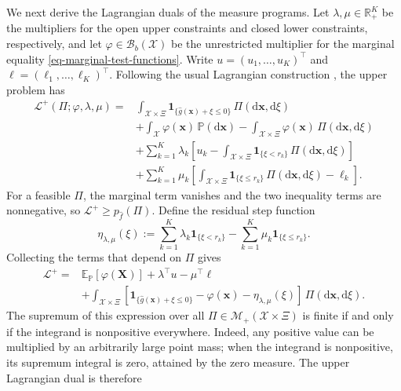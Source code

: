\documentclass[review,11pt,3p,authoryear,nopreprintline]{elsarticle}
\begin{document}
We next derive the Lagrangian duals of the measure programs. Let $\lambda,\mu\in\mathbb R_+^K$ be the multipliers for the open upper constraints and closed lower constraints, respectively, and let $\varphi\in\mathcal B_b(\mathcal X)$ be the unrestricted multiplier for the marginal equality \eqref{eq-marginal-test-functions}. Write $u=(u_1,\ldots,u_K)^\top$ and $\ell=(\ell_1,\ldots,\ell_K)^\top$. Following the usual Lagrangian construction \citep[Section~5.1]{B.V04}, the upper problem has
\begin{equation}
  \begin{aligned}
    \mathcal L^+\left(\Pi;\varphi,\lambda,\mu\right)={}&
    \int_{\mathcal X\times\Xi}\mathbf1_{\{\hat g(\bm x)+\xi\le0\}}\,\Pi\left(\mathrm d\bm x,\mathrm d\xi\right)\\
    &+\int_{\mathcal X}\varphi(\bm x)\,\mathbb P\left(\mathrm d\bm x\right)
    -\int_{\mathcal X\times\Xi}\varphi(\bm x)\,\Pi\left(\mathrm d\bm x,\mathrm d\xi\right)\\
    &+\sum_{k=1}^K\lambda_k
    \left[u_k-\int_{\mathcal X\times\Xi}\mathbf1_{\{\xi<r_k\}}\,\Pi\left(\mathrm d\bm x,\mathrm d\xi\right)\right]\\
    &+\sum_{k=1}^K\mu_k
    \left[\int_{\mathcal X\times\Xi}\mathbf1_{\{\xi\le r_k\}}\,\Pi\left(\mathrm d\bm x,\mathrm d\xi\right)-\ell_k\right].
  \end{aligned}
  \label{eq-upper-lagrangian}
\end{equation}
For a feasible $\Pi$, the marginal term vanishes and the two inequality terms are nonnegative, so $\mathcal L^+\ge p_{\hat f}(\Pi)$. Define the residual step function
\begin{equation}
  \eta_{\lambda,\mu}(\xi):=
  \sum_{k=1}^K\lambda_k\mathbf1_{\{\xi<r_k\}}
  -\sum_{k=1}^K\mu_k\mathbf1_{\{\xi\le r_k\}}.
  \label{eq-dual-step-function}
\end{equation}
Collecting the terms that depend on $\Pi$ gives
\begin{equation}
  \begin{aligned}
    \mathcal L^+={}&\mathbb E_{\mathbb P}\left[\varphi(\bm X)\right]
    +\lambda^\top u-\mu^\top\ell\\
    &+\int_{\mathcal X\times\Xi}
    \left[\mathbf1_{\{\hat g(\bm x)+\xi\le0\}}-\varphi(\bm x)
    -\eta_{\lambda,\mu}(\xi)\right]\,\Pi\left(\mathrm d\bm x,\mathrm d\xi\right).
  \end{aligned}
  \label{eq-collected-upper-lagrangian}
\end{equation}
The supremum of this expression over all $\Pi\in\mathcal M_+(\mathcal X\times\Xi)$ is finite if and only if the integrand is nonpositive everywhere. Indeed, any positive value can be multiplied by an arbitrarily large point mass; when the integrand is nonpositive, its supremum integral is zero, attained by the zero measure. The upper Lagrangian dual is therefore
\end{document}
